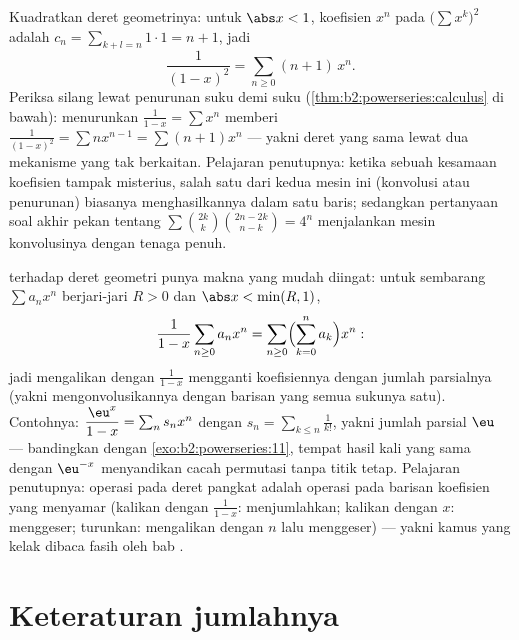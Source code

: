 \begin{example}\label{ex:b2:powerseries:cauchysquare}
Kuadratkan deret geometrinya: untuk $\abs x < 1$, koefisien
$x^n$ pada $\bigl(\sum x^k\bigr)^2$ adalah $c_n = \sum_{k+l=n}
1\cdot1 = n + 1$, jadi
\[
\frac{1}{(1-x)^2} = \sum_{n\geq0}(n+1)\,x^n .
\]
Periksa silang lewat penurunan suku demi suku
(\cref{thm:b2:powerseries:calculus} di bawah): menurunkan
$\frac{1}{1-x} = \sum x^n$ memberi $\frac{1}{(1-x)^2} = \sum
nx^{n-1} = \sum(n+1)x^n$ --- yakni deret yang sama lewat dua
mekanisme yang tak berkaitan. Pelajaran penutupnya: ketika sebuah
kesamaan koefisien tampak misterius, salah satu dari kedua mesin ini
(konvolusi atau penurunan) biasanya menghasilkannya dalam satu baris;
sedangkan pertanyaan soal akhir pekan tentang $\sum\binom{2k}k\binom{2n-2k}{n-k} = 4^n$
menjalankan mesin konvolusinya dengan tenaga penuh.
\end{example}

\begin{example}\label{ex:b2:powerseries:partialsums}
 terhadap deret geometri punya makna yang mudah
diingat: untuk sembarang $\sum a_nx^n$ berjari-jari $R > 0$ dan $\abs x <
\min(R, 1)$,
\[
\frac{1}{1-x}\sum_{n\geq0}a_nx^n
= \sum_{n\geq0}\Bigl(\sum_{k=0}^{n}a_k\Bigr)x^n :
\]
jadi mengalikan dengan $\frac{1}{1-x}$ mengganti koefisiennya dengan
jumlah parsialnya (yakni mengonvolusikannya dengan barisan yang semua
sukunya satu). Contohnya: $\dfrac{\eu^x}{1-x} = \sum_n s_n x^n$ dengan
$s_n = \sum_{k\leq n}\frac{1}{k!}$, yakni jumlah parsial $\eu$ ---
bandingkan dengan \cref{exo:b2:powerseries:11}, tempat hasil kali yang
sama dengan $\eu^{-x}$ menyandikan cacah permutasi tanpa titik tetap.
Pelajaran penutupnya: operasi pada deret pangkat adalah operasi pada
barisan koefisien yang menyamar (kalikan dengan $\frac1{1-x}$:
menjumlahkan; kalikan dengan $x$: menggeser; turunkan: mengalikan dengan
$n$ lalu menggeser) --- yakni kamus yang kelak dibaca fasih oleh bab
.
\end{example}

\section{Keteraturan jumlahnya}

